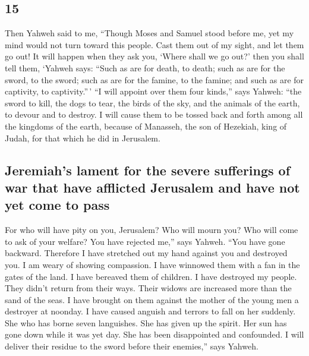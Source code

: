 \begin{paracol}{2}
\begin{otherlanguage}{english}
\hypertarget{section-29}{%
\section{15}\label{section-29}}

 Then Yahweh said to me, ``Though Moses and Samuel stood
before me, yet my mind would not turn toward this people. Cast them out
of my sight, and let them go out!  It will happen when
they ask you, `Where shall we go out?' then you shall tell them, `Yahweh
says: ``Such as are for death, to death; such as are for the sword, to
the sword; such as are for the famine, to the famine; and such as are
for captivity, to captivity.''\,'  ``I will appoint over
them four kinds,'' says Yahweh: ``the sword to kill, the dogs to tear,
the birds of the sky, and the animals of the earth, to devour and to
destroy.  I will cause them to be tossed back and forth
among all the kingdoms of the earth, because of Manasseh, the son of
Hezekiah, king of Judah, for that which he did in Jerusalem.

\hypertarget{jeremiahs-lament-for-the-severe-sufferings-of-war-that-have-afflicted-jerusalem-and-have-not-yet-come-to-pass}{%
\subsection{Jeremiah's lament for the severe sufferings of war that have
afflicted Jerusalem and have not yet come to
pass}\label{jeremiahs-lament-for-the-severe-sufferings-of-war-that-have-afflicted-jerusalem-and-have-not-yet-come-to-pass}}

 For who will have pity on you, Jerusalem? Who will mourn
you? Who will come to ask of your welfare?  You have
rejected me,'' says Yahweh. ``You have gone backward. Therefore I have
stretched out my hand against you and destroyed you. I am weary of
showing compassion.  I have winnowed them with a fan in
the gates of the land. I have bereaved them of children. I have
destroyed my people. They didn't return from their ways. 
Their widows are increased more than the sand of the seas. I have
brought on them against the mother of the young men a destroyer at
noonday. I have caused anguish and terrors to fall on her suddenly.
 She who has borne seven languishes. She has given up the
spirit. Her sun has gone down while it was yet day. She has been
disappointed and confounded. I will deliver their residue to the sword
before their enemies,'' says Yahweh.


\end{otherlanguage}
\end{paracol}
